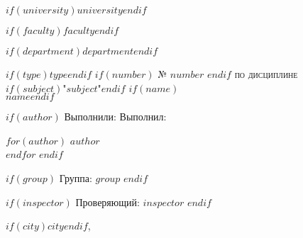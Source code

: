 \begin{titlepage}
	\begin{center}
		\large
		$if(university)$$university$$endif$

		\vspace{0.25cm}

		$if(faculty)$$faculty$$endif$

		$if(department)$$department$$endif$
		\vfill

		\textsc{$if(type)$$type$$endif$ $if(number)$ № $number$ $endif$ по дисциплине \\$if(subject)$"$subject$"$endif$ $if(name)$\small \\ $name$$endif$}

		\bigskip
	\end{center}
	\vfill
	\vfill

	\begin{flushright}
	$if(author)$
	\ifisauthormany
	Выполнили:
	\else
	Выполнил:
	\fi

	$for(author)$
	$author$ \\
	$endfor$
	$endif$

	\vspace{0.25cm}
	$if(group)$
	Группа: $group$
	$endif$

	\vspace{0.25cm}
	$if(inspector)$
	Проверяющий: $inspector$
	$endif$
	\end{flushright}
	\vfill

	\begin{center}
	$if(city)$$city$$endif$, \the\year
	\end{center}
\end{titlepage}

\newpage
